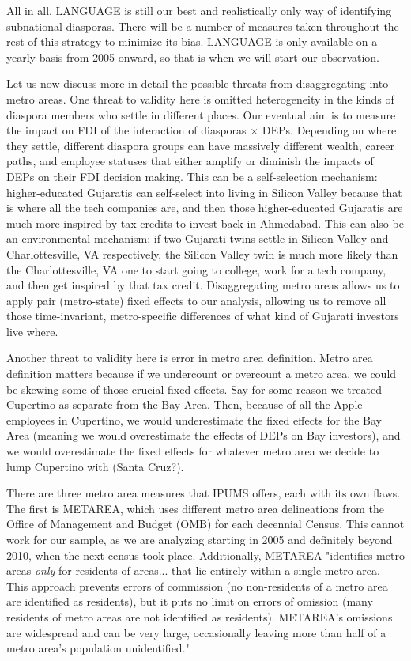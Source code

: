 \documentclass[12pt]{article}
\begin{document}
All in all, LANGUAGE is still our best and realistically only way of identifying subnational diasporas. There will be a number of measures taken throughout the rest of this strategy to minimize its bias. LANGUAGE is only available on a yearly basis from 2005 onward, so that is when we will start our observation.

Let us now discuss more in detail the possible threats from disaggregating into metro areas. One threat to validity here is omitted heterogeneity in the kinds of diaspora members who settle in different places. Our eventual aim is to measure the impact on FDI of the interaction of diasporas $\times$ DEPs. Depending on where they settle, different diaspora groups can have massively different wealth, career paths, and employee statuses that either amplify or diminish the impacts of DEPs on their FDI decision making. This can be a self-selection mechanism: higher-educated Gujaratis can self-select into living in Silicon Valley because that is where all the tech companies are, and then those higher-educated Gujaratis are much more inspired by tax credits to invest back in Ahmedabad. This can also be an environmental mechanism: if two Gujarati twins settle in Silicon Valley and Charlottesville, VA respectively, the Silicon Valley twin is much more likely than the Charlottesville, VA one to start going to college, work for a tech company, and then get inspired by that tax credit. Disaggregating metro areas allows us to apply pair (metro-state) fixed effects to our analysis, allowing us to remove all those time-invariant, metro-specific differences of what kind of Gujarati investors live where.

Another threat to validity here is error in metro area definition. Metro area definition matters because if we undercount or overcount a metro area, we could be skewing some of those crucial fixed effects. Say for some reason we treated Cupertino as separate from the Bay Area. Then, because of all the Apple employees in Cupertino, we would underestimate the fixed effects for the Bay Area (meaning we would overestimate the effects of DEPs on Bay investors), and we would overestimate the fixed effects for whatever metro area we decide to lump Cupertino with (Santa Cruz?). 

There are three metro area measures that IPUMS offers, each with its own flaws. \citep{noauthor_ipums_nodate} The first is METAREA, which uses different metro area delineations from the Office of Management and Budget (OMB) for each decennial Census. This cannot work for our sample, as we are analyzing starting in 2005 and definitely beyond 2010, when the next census took place. Additionally, METAREA "identifies metro areas \textit{only} for residents of areas... that lie entirely within a single metro area. This approach prevents errors of commission (no non-residents of a metro area are identified as residents), but it puts no limit on errors of omission (many residents of metro areas are not identified as residents). METAREA's omissions are widespread and can be very large, occasionally leaving more than half of a metro area's population unidentified." 
\end{document}
